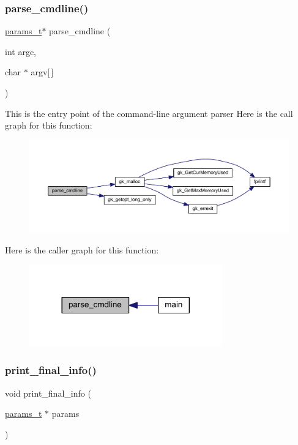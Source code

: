 \subsubsection{\texorpdfstring{parse\+\_\+cmdline()}{parse\_cmdline()}}
{\footnotesize\ttfamily \hyperlink{a00706}{params\+\_\+t}$\ast$ parse\+\_\+cmdline (\begin{DoxyParamCaption}\item[{int}]{argc,  }\item[{char $\ast$}]{argv\mbox{[}$\,$\mbox{]} }\end{DoxyParamCaption})}

This is the entry point of the command-\/line argument parser Here is the call graph for this function\+:\nopagebreak
\begin{figure}[H]
\begin{center}
\leavevmode
\includegraphics[width=350pt]{a00864_a0e7ce196a2f8882777957bf898739f6f_cgraph}
\end{center}
\end{figure}
Here is the caller graph for this function\+:\nopagebreak
\begin{figure}[H]
\begin{center}
\leavevmode
\includegraphics[width=236pt]{a00864_a0e7ce196a2f8882777957bf898739f6f_icgraph}
\end{center}
\end{figure}
\mbox{\label{a00864_a702976a4c55992ddbfc1918ec1b70943}} 
\subsubsection{\texorpdfstring{print\+\_\+final\+\_\+info()}{print\_final\_info()}}
{\footnotesize\ttfamily void print\+\_\+final\+\_\+info (\begin{DoxyParamCaption}\item[{\hyperlink{a00706}{params\+\_\+t} $\ast$}]{params }\end{DoxyParamCaption})}

